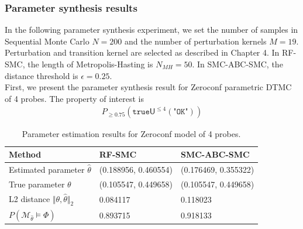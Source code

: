 \subsubsection{Parameter synthesis results}
In the following parameter synthesis experiment, we set the number of samples in Sequential Monte
Carlo $N=200$ and the number of perturbation kernels $M=19$. Perturbation and transition kernel are
selected as described in Chapter 4. In RF-SMC, the length of Metropolis-Hasting is $N_{MH}=50$. In
SMC-ABC-SMC, the distance threshold is $\epsilon=0.25$.\\
First, we present the parameter synthesis result for Zeroconf parametric DTMC of 4 probes. The
property of interest is
\begin{align*}
    P_{\geq 0.75} (\texttt{true} \mathsf{U}^{\leq 4} (\texttt{"OK"}))
\end{align*}
\begin{table}[H]
    \begin{tabular}{|l|l|l|}
        \hline
        Method                                           & RF-SMC               & SMC-ABC-SMC          \\ \hline
        Estimated parameter $\hat{\theta}$               & (0.188956, 0.460554) & (0.176469, 0.355322) \\ \hline
        True parameter $\theta$                          & (0.105547, 0.449658) & (0.105547, 0.449658) \\ \hline
        L2 distance $\Vert \theta, \hat{\theta} \Vert_2$ & 0.084117             & 0.118023             \\ \hline
        $P(\mathcal{M}_{\hat{\theta}}\models\Phi)$       & 0.893715             & 0.918133             \\ \hline
    \end{tabular}
    \caption{Parameter estimation results for Zeroconf model of 4 probes.}
\end{table}

